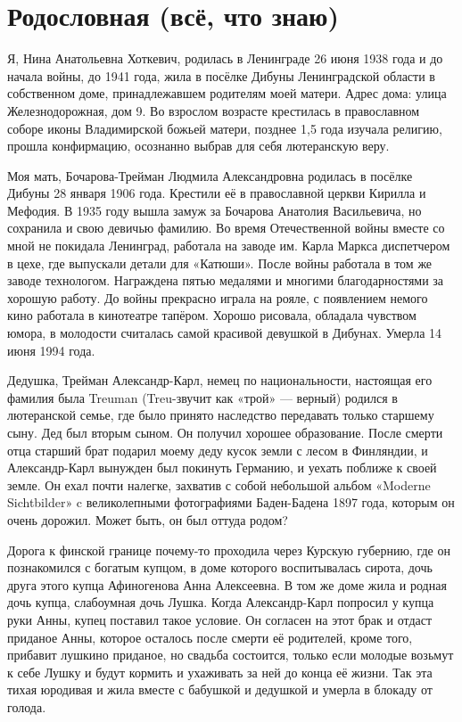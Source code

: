 \section*{Родословная (всё, что знаю)}

Я,  Нина Анатольевна Хоткевич, родилась в Ленинграде 26 июня 1938 года и до начала войны, до 1941 года,  жила  в посёлке Дибуны Ленинградской области в собственном доме, принадлежавшем родителям моей матери.
Адрес дома: улица Железнодорожная, дом 9.
Во взрослом возрасте крестилась в православном соборе иконы Владимирской божьей матери, позднее 1,5 года изучала религию, прошла конфирмацию, осознанно выбрав для себя лютеранскую веру.

Моя мать, Бочарова-Трейман Людмила Александровна  родилась в посёлке Дибуны 28 января 1906 года.
Крестили её в православной церкви Кирилла и Мефодия.
В 1935 году вышла замуж за Бочарова Анатолия Васильевича, но сохранила и свою девичью фамилию.
Во время Отечественной войны вместе со мной не покидала Ленинград, работала на заводе им.
Карла Маркса диспетчером в цехе, где выпускали детали для  «Катюши».
После войны работала в том же заводе технологом.
Награждена пятью медалями и многими благодарностями за хорошую работу.
До войны прекрасно играла на рояле, с появлением немого кино работала в кинотеатре тапёром.
Хорошо рисовала, обладала чувством юмора, в молодости считалась самой красивой девушкой в Дибунах.
Умерла 14 июня 1994 года.

Дедушка, Трейман Александр-Карл, немец по национальности, настоящая его фамилия была Treuman  (Treu-звучит как «трой» --- верный) родился в лютеранской семье, где было принято наследство передавать только старшему сыну.
Дед был вторым сыном.
Он получил хорошее образование.
После смерти отца старший брат подарил моему деду кусок земли с лесом в Финляндии, и Александр-Карл вынужден был покинуть Германию, и уехать поближе к своей земле.
Он ехал почти налегке, захватив с собой небольшой альбом «Moderne Sichtbilder» c великолепными фотографиями Баден-Бадена 1897 года, которым он очень дорожил.
Может быть, он был оттуда родом?

Дорога к финской границе почему-то проходила через Курскую губернию, где он познакомился с богатым купцом, в доме которого воспитывалась сирота, дочь друга этого купца Афиногенова Анна Алексеевна.
В том же доме жила и родная дочь купца, слабоумная дочь Лушка.
Когда Александр-Карл попросил у купца руки Анны, купец поставил такое условие.
Он согласен на этот брак и отдаст приданое Анны, которое осталось после смерти её родителей, кроме того, прибавит лушкино приданое, но свадьба состоится, только если молодые возьмут к себе Лушку и будут кормить и ухаживать за ней до конца её жизни.
Так эта тихая юродивая и жила вместе с бабушкой и дедушкой и умерла в блокаду от голода.

